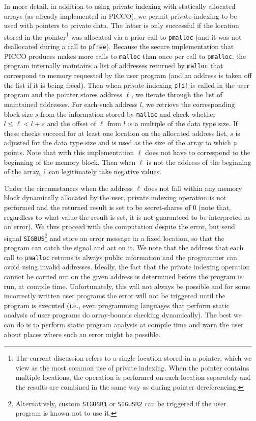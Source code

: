 \documentclass[11pt]{article}
\begin{document}
In more detail, in addition to using private indexing with statically
allocated arrays (as already implemented in PICCO), we permit private
indexing to be used with pointers to private data. The latter is only
successful if the location stored in the pointer\footnote{The current
discussion refers to a single location stored in a pointer, which we view as
the most common use of private indexing. When the pointer contains multiple
locations, the operation is performed on each location separately and the
results are combined in the same way as during pointer dereferencing.} was
allocated via a prior call to \texttt{pmalloc} (and it was not deallocated
during a call to \texttt{pfree}). Because the secure implementation that
PICCO produces makes more calls to \texttt{malloc} than once per call to
\texttt{pmalloc}, the program internally maintains a list of addresses
returned by \texttt{malloc} that correspond to memory requested by the user
program (and an address is taken off the list if it is being freed). Then
when private indexing \texttt{p[i]} is called in the user program and the
pointer stores address $\ell$, we iterate through the list of maintained
addresses. For each such address $l$, we retrieve the corresponding block
size $s$ from the information stored by \texttt{malloc} and check whether $l
\le \ell < l+s$ and the offset of $\ell$ from $l$ is a multiple of the data
type size. If these checks succeed for at least one location on the
allocated address list, $s$ is adjusted for the data type size and is used
as the size of the array to which \texttt{p} points. Note that with this
implementation $\ell$ does not have to correspond to the beginning of the
memory block. Then when $\ell$ is not the address of the beginning of the
array, \texttt{i} can legitimately take negative values.

Under the circumstances when the address $\ell$ does not fall within
any memory block dynamically allocated by the user, private indexing
operation is not performed and the returned result is set to be
secret-shares of 0 (note that, regardless to what value the result is
set, it is not guaranteed to be interpreted as an error). We thus
proceed with the computation despite the error, but send signal
\texttt{SIGBUS}\footnote{Alternatively, custom \texttt{SIGUSR1} or
\texttt{SIGUSR2} can be triggered if the user program is known not to
use it.} and store an error message in a fixed location, so that the
program can catch the signal and act on it. We note that the address
that each call to \texttt{pmalloc} returns is always public
information and the programmer can avoid using invalid addresses.
Ideally, the fact that the private indexing operation cannot be
carried out on the given address is determined before the program is
run, at compile time. Unfortunately, this will not always be possible
and for some incorrectly written user programs the error will not be
triggered until the program is executed (i.e., even programming
languages that perform static analysis of user programs do
array-bounds checking dynamically). The best we can do is to perform
static program analysis at compile time and warn the user about places
where such an error might be possible. 
\end{document}
